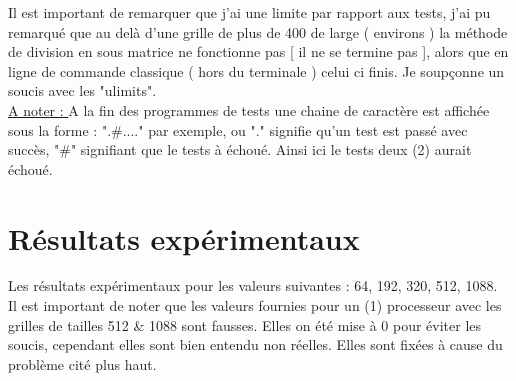 \documentclass[10pt,a4paper]{article}
\begin{document}
Il est important de remarquer que j'ai une limite par rapport aux tests, j'ai pu remarqué que au delà d'une grille de plus de 400 de large ( environs ) la méthode de division en sous matrice ne fonctionne pas [ il ne se termine pas ], alors que en ligne de commande classique ( hors du terminale ) celui ci finis. Je soupçonne un soucis avec les "ulimits". \\

\underline{A noter : } A la fin des programmes de tests une chaine de caractère est affichée sous la forme : ".\#...." par exemple, ou "." signifie qu'un test est passé avec succès, "\#" signifiant que le tests à échoué. Ainsi ici le tests deux (2) aurait échoué.

\section{Résultats expérimentaux}

Les résultats expérimentaux pour les valeurs suivantes : 64, 192, 320, 512, 1088. \\

Il est important de noter que les valeurs fournies pour un (1) processeur avec les grilles de tailles 512 \& 1088 sont fausses. Elles on été mise à 0 pour éviter les soucis, cependant elles sont bien entendu non réelles. Elles sont fixées à cause du problème cité plus haut.\\
\end{document}
